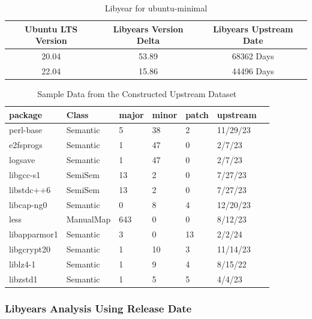 \documentclass[sn-mathphys-num]{sn-jnl}%
\theoremstyle{thmstyleone}%
\theoremstyle{thmstyletwo}%
\theoremstyle{thmstylethree}%
\begin{document}
\begin{table}[h]
    \centering
    \begin{tabular}{|c|c|c|} \hline 
         Ubuntu LTS Version&  Libyears Version Delta& Libyears Upstream Date  \\ \hline 
         20.04&  53.89& 68362 Days \\ \hline 
        22.04& 15.86&44496 Days \\\hline
    \end{tabular}
    \caption{Libyear for ubuntu-minimal}
    \label{tab:libyear}
\end{table}

\begin{table}[htbp]
    \centering
    \begin{tabular}{lllllll}
    \toprule
    package & Class & major & minor & patch & upstream\\
    \midrule
    perl-base & Semantic & 5 & 38 & 2 & 11/29/23 \\
    e2fsprogs & Semantic & 1 & 47 & 0 & 2/7/23 \\
    logsave & Semantic & 1 & 47 & 0 & 2/7/23  \\
    libgcc-s1 & SemiSem & 13 & 2 & 0 & 7/27/23 \\
    libstdc++6 & SemiSem & 13 & 2 & 0 & 7/27/23 \\
    libcap-ng0 & Semantic & 0 & 8 & 4 & 12/20/23 \\
    less & ManualMap & 643 & 0 & 0 & 8/12/23  \\
    libapparmor1 & Semantic & 3 & 0 & 13 & 2/2/24  \\
    libgcrypt20 & Semantic & 1 & 10 & 3& 11/14/23 \\
    liblz4-1 & Semantic & 1 & 9 & 4 & 8/15/22 \\
    libzstd1 & Semantic & 1 & 5& 5 & 4/4/23 \\
    \bottomrule
    \end{tabular}
    \caption{Sample Data from the Constructed Upstream Dataset}
    \label{tab:upstream_data}
\end{table}

\subsubsection{\textbf{Libyears Analysis Using Release Date}}
\end{document}
